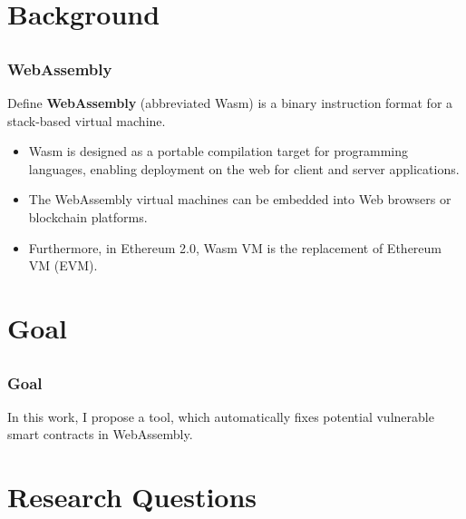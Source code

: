\documentclass[notheorems, aspectratio=54]{beamer}
\begin{document}

\section{Background}
\subsection{}
\begin{frame}
    \frametitle{WebAssembly}

    \begin{block}{Define}
        \textbf{WebAssembly} (abbreviated Wasm) is a binary instruction format for a stack-based virtual machine.
    \end{block}

    \begin{itemize}
        \item Wasm is designed as a portable compilation target for programming languages, enabling deployment on the web for client and server applications.
        \item The WebAssembly virtual machines can be embedded into Web browsers or blockchain platforms.
        \item Furthermore, in Ethereum 2.0, Wasm VM is the replacement of Ethereum VM (EVM).
    \end{itemize}
    
\end{frame}


\section{Goal}
\subsection{}
\begin{frame}
    \frametitle{Goal}
    
    In this work, I propose a tool, which automatically fixes potential vulnerable smart contracts in WebAssembly.

\end{frame}


\section{Research Questions}
\end{document}
